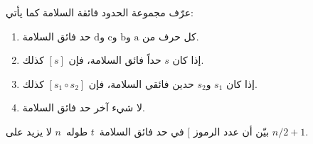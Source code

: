 \documentclass[../../../include/open-logic-section]{subfiles}
\begin{document}
\begin{prob}
  عرّف مجموعة الحدود فائقة السلامة كما يأتي:
  \begin{enumerate}
  \item كل حرف من $\mathrm{a}$ و$\mathrm{b}$ و$\mathrm{c}$
    و$\mathrm{d}$ حد فائق السلامة.
  \item إذا كان $s$ حداً فائق السلامة، فإن $[s]$ كذلك.
  \item إذا كان $s_1$ و$s_2$ حدين فائقي السلامة، فإن
    $[s_1 \circ s_2]$ كذلك.
  \item لا شيء آخر حد فائق السلامة.
  \end{enumerate}
  بيّن أن عدد الرموز $[$ في حد فائق السلامة~$t$ طوله~$n$ لا يزيد على
  $n/2 +1$.
\end{prob}
\end{document}
